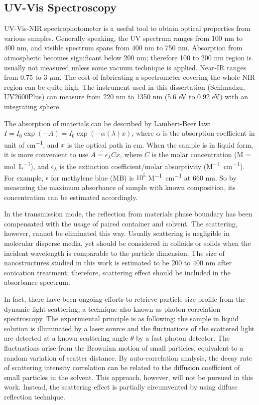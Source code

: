 \subsection{UV-Vis Spectroscopy}
UV-Vis-NIR spectrophotometer is a useful tool to obtain optical properties from various samples. Generally speaking, the UV spectrum ranges from 100 nm to 400 nm, and visible spectrum spans from 400 nm to 750 nm. Absorption from atmospheric  becomes significant below 200 nm; therefore 100 to 200 nm region is usually not measured unless some vacuum technique is applied. Near-IR ranges from 0.75 to 3 $\mu$m. The cost of fabricating a spectrometer covering the whole NIR region can be quite high. The instrument used in this dissertation (Schimadzu, UV2600Plus) can measure from 220 nm to 1350 nm (5.6 eV to 0.92 eV) with an integrating sphere.

The absorption of materials can be described by Lambert-Beer law: $I = I_0 \exp(-A)=I_0\exp(-\alpha(\lambda) x)$, where $\alpha$ is the absorption coefficient in unit of \si{cm^{-1}}, and $x$ is the optical path in cm. When the sample is in liquid form, it is more convenient to use $A =\epsilon_\lambda C x$, where $C$ is the molar concentration (M = \si{\mole \per L}), and $\epsilon_\lambda$ is the extinction coefficient/molar absorptivity (\si{M^{-1} cm^{-1}}). For example, $\epsilon$ for methylene blue (MB) is $10^5$ \si{M^{-1}cm^{-1}} at 660 nm.\cite{Mills1999} So by measuring the maximum absorbance of sample with known composition, its concentration can be estimated accordingly. 

In the transmission mode, the reflection from materials phase boundary has been compensated with the usage of paired container and solvent. The scattering, however, cannot be eliminated this way. Usually scattering is negligible in molecular disperse media, yet should be considered in colloids or solids when the incident wavelength is comparable to the particle dimension. The size of nanostructures studied in this work is estimated to be 200 to 400 nm after sonication treatment; therefore, scattering effect should be included in the absorbance spectrum. 

In fact, there have been ongoing efforts to retrieve particle size profile from the dynamic light scattering, a technique also known as photon correlation spectroscopy. The experimental principle is as following: the sample in liquid solution is illuminated by a laser source and the fluctuations of the scattered light are detected at a known scattering angle $\theta$ by a fast photon detector. The fluctuations arise from the Brownian motion of small particles, equivalent to a random variation of scatter distance. By auto-correlation analysis, the decay rate of scattering intensity correlation can be related to the diffusion coefficient of small particles in the solvent.\cite{Maret1987} This approach, however, will not be pursued in this work. Instead, the scattering effect is partially circumvented by using diffuse reflection technique. 

